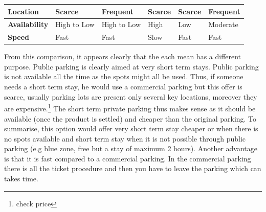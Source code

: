 \documentclass[12pt,a4paper,oneside]{book}
\begin{document}
\begin{table}[h]
\begin{adjustbox}{center}
\begin{tabular}{l|l|l|l|l|l|}
\multicolumn{1}{|l|}{\textbf{Location}}     & Scarce                             & Frequent                                                     & Scarce                                                                                                      & Scarce                                                                                                             & Frequent                                                                                                            \\ \hline
\multicolumn{1}{|l|}{\textbf{Availability}} & High to Low                        & High to Low                                                  & High                                                                                                        & Low                                                                                                                & Moderate                                                                                                            \\ \hline
\multicolumn{1}{|l|}{\textbf{Speed}}        & Fast                               & Fast                                                         & Slow                                                                                                        & Fast                                                                                                               & Fast                                                                                                                \\ \hline
\end{tabular}
\end{adjustbox}
\end{table}

From this comparison, it appears clearly that the each mean has a different purpose. Public parking is clearly aimed at very short term stays. Public parking is not available all the time as the spots might all be used. Thus, if someone needs a short term stay, he would use a commercial parking but this offer is scarce, usually parking lots are present only several key locations, moreover they are expensive.\footnote{check price} The short term private parking thus makes sense as it should be available (once the product is settled) and cheaper than the original parking. To summarise, this option would offer very short term stay cheaper or when there is no spots available and short term stay when it is not possible through public parking (e.g blue zone, free but a stay of maximum 2 hours). Another advantage is that it is fast compared to a commercial parking. In the commercial parking there is all the ticket procedure and then you have to leave the parking which can takes time.\\
\end{document}
